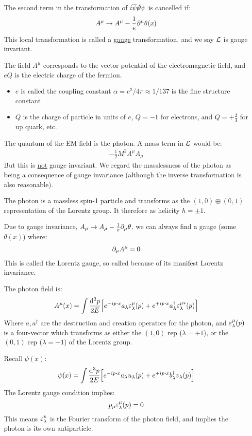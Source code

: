 The second term in the transformation of $i\bar{\psi}\sla{\D}\psi$ is cancelled if:
\begin{align*}
  A^\mu\to A^\mu-\frac1e\partial^\mu\theta(x)
\end{align*}
This local transformation is called a \underline{gauge} transformation, and we say $\mathcal{L}$ is gauge invariant.

The field $A^\mu$ corresponds to the vector potential of the electromagnetic field, and $eQ$ is the electric charge of the fermion.
\begin{itemize}
\item $e$ is called the coupling constant $\alpha=e^2/4\pi\approx 1/137$ is the fine structure constant
\item $Q$ is the charge of particle in units of $e$, $Q=-1$ for electrons, and $Q=+\frac23$ for up quark, etc.
\end{itemize}
The quantum of the EM field is the photon. A mass term in $\mathcal{L}$ would be:
\begin{align*}
  -\frac12M^2A^\mu A_\mu
\end{align*}
But this is \underline{not} gauge invariant. We regard the masslessness of the photon as being a consequence of gauge invariance (although the inverse transformation is also reasonable).

The photon is a massless spin-1 particle and transforms as the $(1,0)\oplus(0,1)$ representation of the Lorentz group. It therefore as helicity $h=\pm1$.

Due to gauge invariance, $A_\mu\to A_\mu-\frac1e\partial_\mu\theta$, we can always find a gauge (some $\theta(x)$) where:
\begin{align*}
  \partial_\mu A^\mu=0
\end{align*}
This is called the Lorentz gauge, so called because of its manifest Lorentz invariance.

The photon field is:
\begin{align*}
  A^\mu(x)=\int\frac{\dd[3]{p}}{2E}\qty[
  e^{-ip\vdot x}a_\lambda\veps^\mu_\lambda(p)+
  e^{+ip\vdot x}a^\dag_\lambda\veps^{\mu*}_\lambda(p)
  ]
\end{align*}
Where $a,a^\dag$ are the destruction and creation operators for the photon, and $\varepsilon^\mu_\lambda(p)$ is a four-vector which transforms as either the $(1,0)$ rep ($\lambda=+1$), or the $(0,1)$ rep ($\lambda=-1$) of the Lorentz group.

Recall $\psi(x)$:
\begin{align*}
  \psi(x)=\int\frac{\dd[3]{p}}{2E}\qty[
  e^{-ip\vdot x}a_\lambda u_\lambda(p)+
  e^{+ip\vdot x}b^\dag_\lambda v_\lambda(p)
  ]
\end{align*}
The Lorentz gauge condition implies:
\begin{align*}
  p_\mu\varepsilon^\mu_\lambda(p)=0
\end{align*}
This means $\varepsilon^\mu_\lambda$ is the Fourier transform of the photon field, and implies the photon is its own antiparticle.

